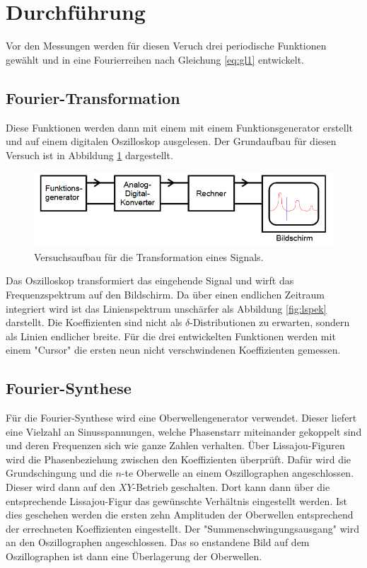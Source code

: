 \section{Durchführung}
\label{sec:Durchführung}
Vor den Messungen werden für diesen Veruch drei periodische Funktionen gewählt und in eine Fourierreihen nach Gleichung \eqref{eq:gl1} entwickelt.
\subsection{Fourier-Transformation}
Diese Funktionen werden dann mit einem mit einem Funktionsgenerator erstellt und auf einem digitalen Oszilloskop ausgelesen.
Der Grundaufbau für diesen Versuch ist in Abbildung \ref{fig:aufbau} dargestellt.
\begin{figure}[H]
    \centering
    \caption{Versuchsaufbau für die Transformation eines Signals.}%
    \label{fig:aufbau}
    \includegraphics[width=\textwidth-20em]{content/aufbau.png}
\end{figure}
\noindent
Das Oszilloskop transformiert das eingehende Signal und wirft das Frequenzspektrum auf den Bildschirm.
Da über einen endlichen Zeitraum integriert wird ist das Linienspektrum unschärfer als Abbildung \ref{fig:lspek} darstellt.
Die Koeffizienten sind nicht als $\delta$-Distributionen zu erwarten, sondern als Linien endlicher breite.
Für die drei entwickelten Funktionen werden mit einem "Cursor" die ersten neun nicht verschwindenen Koeffizienten gemessen.
\subsection{Fourier-Synthese}
Für die Fourier-Synthese wird eine Oberwellengenerator verwendet. Dieser liefert eine Vielzahl an Sinusspannungen, welche Phasenstarr miteinander gekoppelt sind und deren Frequenzen sich wie ganze Zahlen verhalten.
Über Lissajou-Figuren wird die Phasenbeziehung zwischen den Koeffizienten überprüft.
Dafür wird die Grundschingung und die $n$-te Oberwelle an einem Oszillographen angeschlossen.
Dieser wird dann auf den $XY$-Betrieb geschalten.
Dort kann dann über die entsprechende Lissajou-Figur das gewünschte Verhältnis eingestellt werden.
Ist dies geschehen werden die ersten zehn Amplituden der Oberwellen entsprechend der errechneten Koeffizienten eingestellt.
Der "Summenschwingungsausgang" wird an den Oszillographen angeschlossen.
Das so enstandene Bild auf dem Oszillographen ist dann eine Überlagerung der Oberwellen.
 
